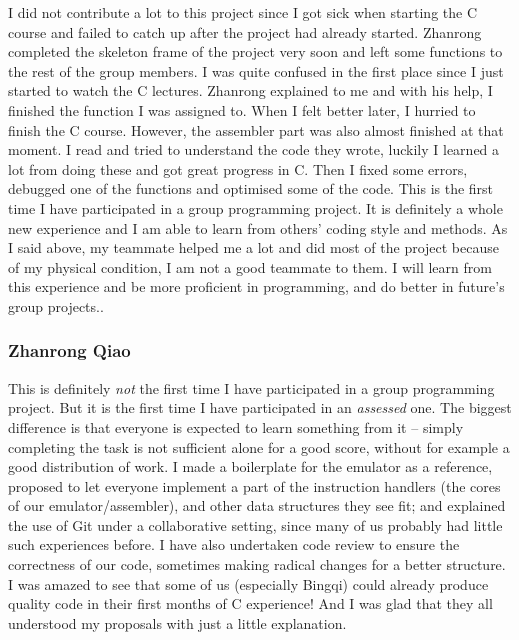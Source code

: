 \documentclass[11pt]{article}
\begin{document}
I did not contribute a lot to this project since I got sick when starting the C course and failed to catch up after the project had already started. Zhanrong completed the skeleton frame of the project very soon and left some functions to the rest of the group members. I was quite confused in the first place since I just started to watch the C lectures. Zhanrong explained to me and with his help, I finished the function I was assigned to. When I felt better later, I hurried to finish the C course. However, the assembler part was also almost finished at that moment. I read and tried to understand the code they wrote, luckily I learned a lot from doing these and got great progress in C. Then I fixed some errors, debugged one of the functions and optimised some of the code. This is the first time I have participated in a group programming project. It is definitely a whole new experience and I am able to learn from others’ coding style and methods. As I said above, my teammate helped me a lot and did most of the project because of my physical condition, I am not a good teammate to them. I will learn from this experience and be more proficient in programming, and do better in future’s group projects..

\subsubsection{Zhanrong Qiao}

This is definitely \textit{not} the first time I have participated in a group programming project. But it is the first time I have participated in an \textit{assessed} one. The biggest difference is that everyone is expected to learn something from it – simply completing the task is not sufficient alone for a good score, without for example a good distribution of work. I made a boilerplate for the emulator as a reference, proposed to let everyone implement a part of the instruction handlers (the cores of our emulator/assembler), and other data structures they see fit; and explained the use of Git under a collaborative setting, since many of us probably had little such experiences before. I have also undertaken code review to ensure the correctness of our code, sometimes making radical changes for a better structure. I was amazed to see that some of us (especially Bingqi) could already produce quality code in their first months of C experience! And I was glad that they all understood my proposals with just a little explanation.
\end{document}
